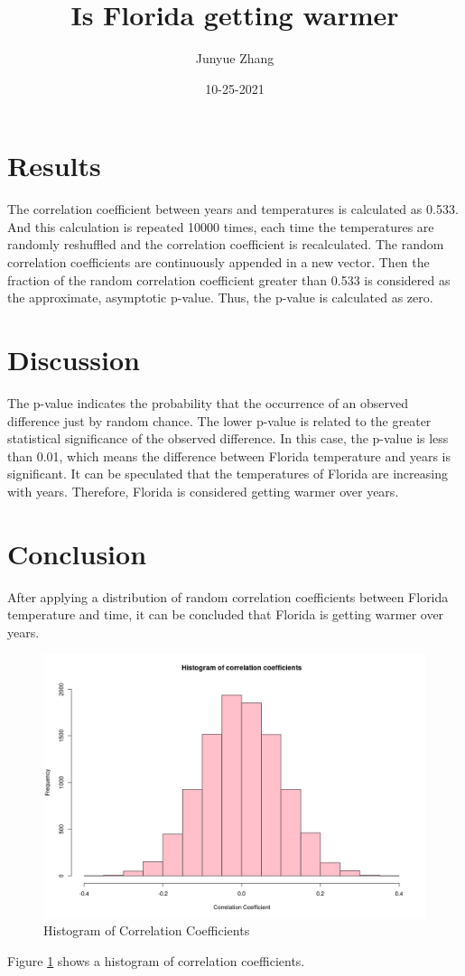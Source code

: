 \documentclass[10pt, a4paper]{article}
\title{Is Florida getting warmer}
\author{Junyue Zhang}
\date{10-25-2021}
\begin{document}
  \maketitle
  
  \section{Results}
    The correlation coefficient between years and temperatures is calculated as 0.533. And this calculation is repeated 10000 times, each time the temperatures are randomly reshuffled and the correlation coefficient is recalculated. The random correlation coefficients are continuously appended in a new vector. Then the fraction of the random correlation coefficient greater than 0.533 is considered as the approximate, asymptotic p-value. 
    Thus, the p-value is calculated as zero.  
   
  \section{Discussion}
    The p-value indicates the probability that the occurrence of an observed difference just by random chance. The lower p-value is related to the greater statistical significance of the observed difference.
    In this case, the p-value is less than 0.01, which means the difference between Florida temperature and years is significant.
    It can be speculated that the temperatures of Florida are increasing with years.  
    Therefore, Florida is considered getting warmer over years.

  \section{Conclusion}
    After applying a distribution of random correlation coefficients between Florida temperature and time, it can be concluded that Florida is getting warmer over years.

\begin{figure}[h]
  \centering
  \includegraphics[scale = 0.3]{./histogram_of_rcc.png}
  \caption{Histogram of Correlation Coefficients}
  \label{figure1}
\end{figure}
Figure \ref{figure1} shows a histogram of correlation coefficients.
\end{document}
